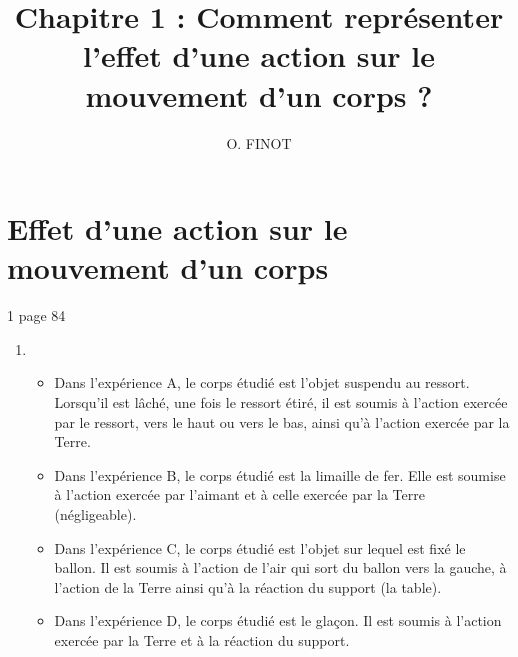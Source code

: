 \documentclass[xcolor={dvipsnames}]{beamer}
\title{Chapitre 1 : Comment représenter l'effet d'une action sur le mouvement d'un corps ?}
\author{O. FINOT}\institute{Collège S$^t$ Bernard}
\begin{document}
\begin{frame}
  \titlepage 
\end{frame}

\section{Effet d'une action sur le mouvement d'un corps}



\begin{frame}
	\begin{myact}{1 page 84}
		\begin{enumerate}
			\item \begin{itemize}\pause
				\item Dans l'expérience A, le corps étudié est l'objet suspendu au ressort. Lorsqu'il est lâché, une fois le ressort étiré, il est soumis à l'action exercée par le ressort, vers le haut ou vers le bas, ainsi qu'à l'action exercée par la Terre.\pause
				\item Dans l'expérience B, le corps étudié est la limaille de fer. Elle est soumise à l'action exercée par l'aimant et à celle exercée par la Terre (négligeable).\pause
				\item Dans l'expérience C, le corps étudié est l'objet sur lequel est fixé le ballon. Il est soumis à l'action de l'air qui sort du ballon vers la gauche, à l'action de la Terre ainsi qu'à la réaction du support (la table).\pause
				\item Dans l'expérience D, le corps étudié est le glaçon. Il est soumis à l'action exercée par la Terre et à la réaction du support.
			\end{itemize}
			
			
		\end{enumerate}
	\end{myact}
\end{frame}
\end{document}
